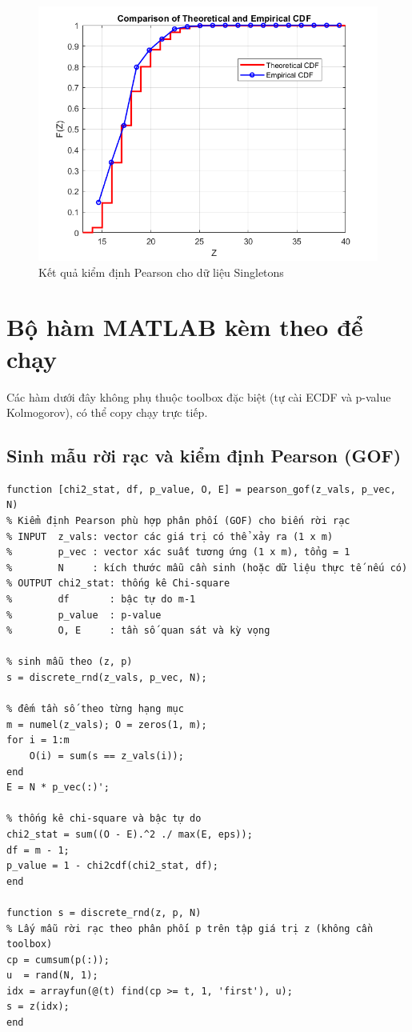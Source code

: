 \begin{figure}[h!]
    \centering
    \includegraphics[width=0.8\linewidth]{../../assets/images/Singletons_Pearson.png}
    \caption{Kết quả kiểm định Pearson cho dữ liệu Singletons}
\end{figure}

\section{Bộ hàm MATLAB kèm theo để chạy}
Các hàm dưới đây không phụ thuộc toolbox đặc biệt (tự cài ECDF và p-value Kolmogorov), có thể copy chạy trực tiếp.

\subsection{Sinh mẫu rời rạc và kiểm định Pearson (GOF)}
\begin{matlab}
\begin{lstlisting}
function [chi2_stat, df, p_value, O, E] = pearson_gof(z_vals, p_vec, N)
% Kiểm định Pearson phù hợp phân phối (GOF) cho biến rời rạc
% INPUT  z_vals: vector các giá trị có thể xảy ra (1 x m)
%        p_vec : vector xác suất tương ứng (1 x m), tổng = 1
%        N     : kích thước mẫu cần sinh (hoặc dữ liệu thực tế nếu có)
% OUTPUT chi2_stat: thống kê Chi-square
%        df       : bậc tự do m-1
%        p_value  : p-value
%        O, E     : tần số quan sát và kỳ vọng

% sinh mẫu theo (z, p)
s = discrete_rnd(z_vals, p_vec, N);

% đếm tần số theo từng hạng mục
m = numel(z_vals); O = zeros(1, m);
for i = 1:m
    O(i) = sum(s == z_vals(i));
end
E = N * p_vec(:)';

% thống kê chi-square và bậc tự do
chi2_stat = sum((O - E).^2 ./ max(E, eps));
df = m - 1;
p_value = 1 - chi2cdf(chi2_stat, df);
end

function s = discrete_rnd(z, p, N)
% Lấy mẫu rời rạc theo phân phối p trên tập giá trị z (không cần toolbox)
cp = cumsum(p(:));
u  = rand(N, 1);
idx = arrayfun(@(t) find(cp >= t, 1, 'first'), u);
s = z(idx);
end
\end{lstlisting}
\end{matlab}

